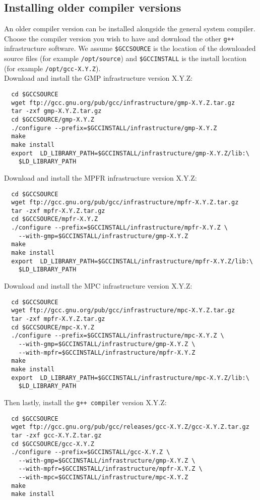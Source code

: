 \documentclass[12pt,a4paper]{report}
\begin{document}
\subsection{Installing older compiler versions}
An older compiler version can be installed alongside the general system compiler. Choose the compiler version you wish to have and download the other \texttt{g++} infrastructure software. We assume \texttt{\$GCCSOURCE} is the location of the downloaded source files (for example \texttt{/opt/source}) and \texttt{\$GCCINSTALL} is the install location (for example \texttt{/opt/gcc-X.Y.Z}).\\
Download and install the GMP infrastructure version X.Y.Z:
\footnotesize
\begin{verbatim}
  cd $GCCSOURCE
  wget ftp://gcc.gnu.org/pub/gcc/infrastructure/gmp-X.Y.Z.tar.gz
  tar -zxf gmp-X.Y.Z.tar.gz
  cd $GCCSOURCE/gmp-X.Y.Z
  ./configure --prefix=$GCCINSTALL/infrastructure/gmp-X.Y.Z
  make
  make install
  export  LD_LIBRARY_PATH=$GCCINSTALL/infrastructure/gmp-X.Y.Z/lib:\
    $LD_LIBRARY_PATH
\end{verbatim}
\normalsize
Download and install the MPFR infrastructure version X.Y.Z:
\footnotesize
\begin{verbatim}
  cd $GCCSOURCE
  wget ftp://gcc.gnu.org/pub/gcc/infrastructure/mpfr-X.Y.Z.tar.gz
  tar -zxf mpfr-X.Y.Z.tar.gz
  cd $GCCSOURCE/mpfr-X.Y.Z
  ./configure --prefix=$GCCINSTALL/infrastructure/mpfr-X.Y.Z \
    --with-gmp=$GCCINSTALL/infrastructure/gmp-X.Y.Z
  make
  make install
  export  LD_LIBRARY_PATH=$GCCINSTALL/infrastructure/mpfr-X.Y.Z/lib:\
    $LD_LIBRARY_PATH
\end{verbatim}
\normalsize
Download and install the MPC infrastructure version X.Y.Z:
\footnotesize
\begin{verbatim}
  cd $GCCSOURCE
  wget ftp://gcc.gnu.org/pub/gcc/infrastructure/mpc-X.Y.Z.tar.gz
  tar -zxf mpfr-X.Y.Z.tar.gz
  cd $GCCSOURCE/mpc-X.Y.Z
  ./configure --prefix=$GCCINSTALL/infrastructure/mpc-X.Y.Z \
    --with-gmp=$GCCINSTALL/infrastructure/gmp-X.Y.Z \
    --with-mpfr=$GCCINSTALL/infrastructure/mpfr-X.Y.Z
  make
  make install
  export  LD_LIBRARY_PATH=$GCCINSTALL/infrastructure/mpc-X.Y.Z/lib:\
    $LD_LIBRARY_PATH
\end{verbatim}
\normalsize
Then lastly, install the \texttt{g++ compiler} version X.Y.Z:
\footnotesize
\begin{verbatim}
  cd $GCCSOURCE
  wget ftp://gcc.gnu.org/pub/gcc/releases/gcc-X.Y.Z/gcc-X.Y.Z.tar.gz
  tar -zxf gcc-X.Y.Z.tar.gz
  cd $GCCSOURCE/gcc-X.Y.Z
  ./configure --prefix=$GCCINSTALL/gcc-X.Y.Z \
    --with-gmp=$GCCINSTALL/infrastructure/gmp-X.Y.Z \
    --with-mpfr=$GCCINSTALL/infrastructure/mpfr-X.Y.Z \
    --with-mpc=$GCCINSTALL/infrastructure/mpc-X.Y.Z
  make
  make install
\end{verbatim}
\end{document}
